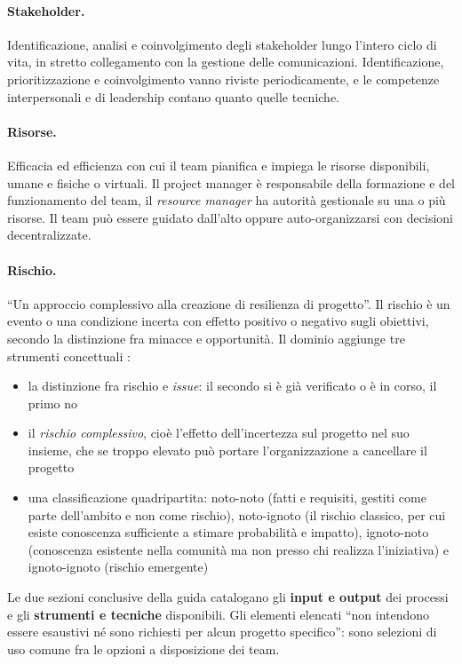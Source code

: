 \paragraph{Stakeholder.} Identificazione, analisi e coinvolgimento degli
stakeholder lungo l'intero ciclo di vita, in stretto collegamento con la
gestione delle comunicazioni. Identificazione, prioritizzazione e coinvolgimento
vanno riviste periodicamente, e le competenze interpersonali e di leadership
contano quanto quelle tecniche.

\paragraph{Risorse.} Efficacia ed efficienza con cui il team pianifica e impiega
le risorse disponibili, umane e fisiche o virtuali. Il project manager \`e
responsabile della formazione e del funzionamento del team, il \emph{resource
manager} ha autorit\`a gestionale su una o pi\`u risorse. Il team pu\`o essere
guidato dall'alto oppure auto-organizzarsi con decisioni decentralizzate.

\paragraph{Rischio.} ``Un approccio complessivo alla creazione di resilienza di
progetto''. Il rischio \`e un evento o una condizione incerta con effetto
positivo o negativo sugli obiettivi, secondo la distinzione fra minacce e
opportunit\`a. Il dominio aggiunge tre strumenti concettuali \cite{pmbok8}:
\begin {itemize}
\item la distinzione fra rischio e \emph{issue}: il secondo si \`e gi\`a
verificato o \`e in corso, il primo no
\item il \emph{rischio complessivo}, cio\`e l'effetto dell'incertezza sul
progetto nel suo insieme, che se troppo elevato pu\`o portare l'organizzazione a
cancellare il progetto
\item una classificazione quadripartita: noto-noto (fatti e requisiti, gestiti
come parte dell'ambito e non come rischio), noto-ignoto (il rischio classico,
per cui esiste conoscenza sufficiente a stimare probabilit\`a e impatto),
ignoto-noto (conoscenza esistente nella comunit\`a ma non presso chi realizza
l'iniziativa) e ignoto-ignoto (rischio emergente)
\end {itemize}

Le due sezioni conclusive della guida catalogano gli \textbf{input e output} dei
processi e gli \textbf{strumenti e tecniche} disponibili. Gli elementi elencati
``non intendono essere esaustivi n\'e sono richiesti per alcun progetto
specifico'': sono selezioni di uso comune fra le opzioni a disposizione dei
team.


